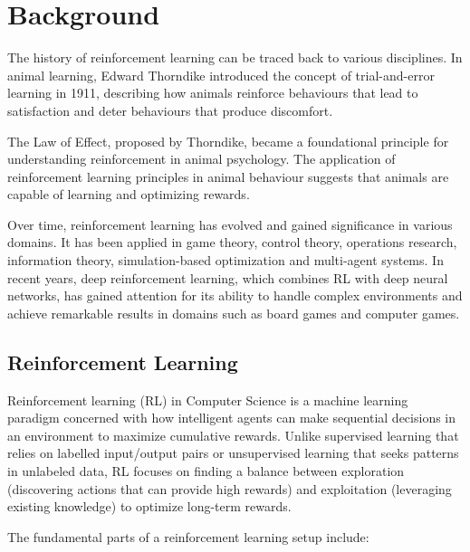 \section{Background}

\begin{textblock}
The history of reinforcement learning can be traced back to various disciplines. In animal learning, Edward Thorndike introduced the concept of trial-and-error learning in 1911, describing how animals reinforce behaviours that lead to satisfaction and deter behaviours that produce discomfort. 

The Law of Effect, proposed by Thorndike, became a foundational principle for understanding reinforcement in animal psychology\cite{thorndikewiki}. The application of reinforcement learning principles in animal behaviour suggests that animals are capable of learning and optimizing rewards.

Over time, reinforcement learning has evolved and gained significance in various domains. It has been applied in game theory\cite{nowe2012}, control theory\cite{busoniu2018}, operations research\cite{hubbs2020}, information theory\cite{russo2015}, simulation-based optimization\cite{gosavi2018} and multi-agent systems\cite{zhang2019}. In recent years, deep reinforcement learning, which combines RL with deep neural networks, has gained attention for its ability to handle complex environments and achieve remarkable results in domains such as board games and computer games.\cite{alphastar2019}
\end{textblock}



\subsection{Reinforcement Learning}

\begin{textblock}
Reinforcement learning (RL) in Computer Science is a machine learning paradigm concerned with how intelligent agents can make sequential decisions in an environment to maximize cumulative rewards. Unlike supervised learning that relies on labelled input/output pairs or unsupervised learning that seeks patterns in unlabeled data, RL focuses on finding a balance between exploration (discovering actions that can provide high rewards) and exploitation (leveraging existing knowledge) to optimize long-term rewards.\cite{suttonandbarto2018}\cite{aima2022}

The fundamental parts of a reinforcement learning setup include:
\end{textblock}


